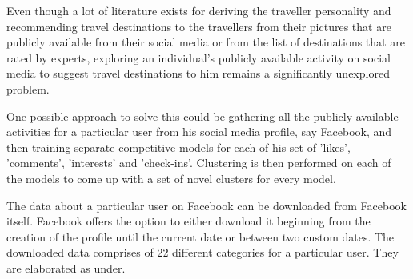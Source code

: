 Even though a lot of literature exists for deriving the traveller personality and recommending travel destinations to the travellers from their pictures that are publicly available from their social media or from the list of destinations that are rated by experts, exploring an individual's publicly available activity on social media to suggest travel destinations to him remains a significantly unexplored problem.

One possible approach to solve this could be gathering all the publicly available activities for a particular user from his social media profile, say Facebook, and then training separate competitive models for each of his set of 'likes', 'comments', 'interests' and 'check-ins'. Clustering is then performed on each of the models to come up with a set of novel clusters for every model. 

The data about a particular user on Facebook can be downloaded from Facebook itself. Facebook offers the option to either download it beginning from the creation of the profile until the current date or between two custom dates.
The downloaded data comprises of 22 different categories for a particular user. They are elaborated as under. 


